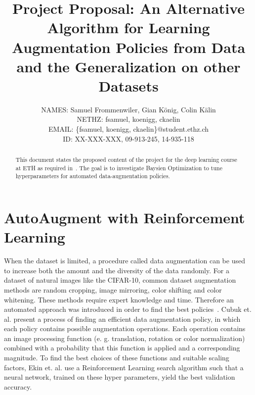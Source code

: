 \documentclass[10pt,twocolumn,letterpaper]{article}
\begin{document}
\title{Project Proposal: An Alternative Algorithm for Learning Augmentation Policies from Data and the Generalization on other Datasets}

\author{
    	\small{NAMES: Samuel Frommenwiler, Gian K\"onig, Colin K\"alin} \\
   	\small{NETHZ: fsamuel, koenigg, ckaelin}\\
	\small{EMAIL: \{fsamuel, koenigg, ckaelin\}$@$student.ethz.ch}\\
    	\small{ID: XX-XXX-XXX, 09-913-245, 14-935-118}
}

\maketitle

\begin{abstract}
   This document states the proposed content of the project for the deep learning course at ETH as required in~\cite{DL18}. The goal is to investigate Baysien Optimization to tune hyperparameters for automated data-augmentation policies.
\end{abstract}

\section{AutoAugment with Reinforcement Learning}
When the dataset is limited, a procedure called data augmentation can be used to increase both the amount and the diversity of the data randomly. For a dataset of natural images like the CIFAR-10, common dataset augmentation methods are random cropping, image mirroring, color shifting and color whitening. These methods require expert knowledge and time. Therefore an automated approach was introduced in order to find the best policies~\cite{Ekin}. Cubuk et. al. present a process of finding an efficient data augmentation policy, in which each policy contains possible augmentation operations. Each operation contains an image processing function (e. g. translation, rotation or color normalization) combined with a probability that this function is applied and a corresponding magnitude. To find the best choices of these functions and suitable scaling factors, Ekin et. al. use a Reinforcement Learning search algorithm such that a neural network, trained on these hyper parameters, yield the best validation accuracy.
\end{document}
